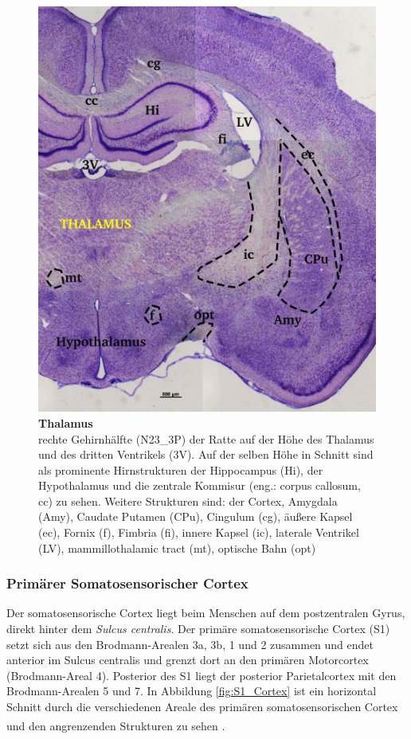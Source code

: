 \documentclass[12pt,a4paper,pdftex]{article}
\begin{document}
\begin{figure}[H]
    \centering
    \includegraphics{pictures/somatosensory/thalamus_somato.png}
    \caption[Thalamus]{\textbf{Thalamus}\\
    rechte Gehirnhälfte (N23\_3P) der Ratte auf der Höhe des Thalamus und des dritten Ventrikels (3V). Auf der selben Höhe in Schnitt sind als prominente Hirnstrukturen der Hippocampus (Hi), der Hypothalamus und die zentrale Kommisur (eng.: corpus callosum, cc) zu sehen. Weitere Strukturen sind: der Cortex, Amygdala (Amy), Caudate Putamen (CPu), Cingulum (cg), äußere Kapsel (ec), Fornix (f), Fimbria (fi), innere Kapsel (ic), laterale Ventrikel (LV), mammillothalamic tract (mt), optische Bahn (opt)}
    \label{fig:thalamus_somato}
\end{figure}

\subsubsection*{Primärer Somatosensorischer Cortex}
\label{subsubsec:S1}
Der somatosensorische Cortex liegt beim Menschen auf dem postzentralen Gyrus, direkt hinter dem \textit{Sulcus centralis}. Der primäre somatosensorische Cortex (S1) setzt sich aus den Brodmann-Arealen 3a, 3b, 1 und 2 zusammen und endet anterior im Sulcus centralis und grenzt dort an den primären Motorcortex (Brodmann-Areal 4). Posterior des S1 liegt der posterior Parietalcortex mit den Brodmann-Arealen 5 und 7. In Abbildung \ref{fig:S1_Cortex} ist ein horizontal Schnitt durch die verschiedenen Areale des primären somatosensorischen Cortex und den angrenzenden Strukturen zu sehen \textsuperscript{\cite[23]{kandel2013principles}}. 
\end{document}
